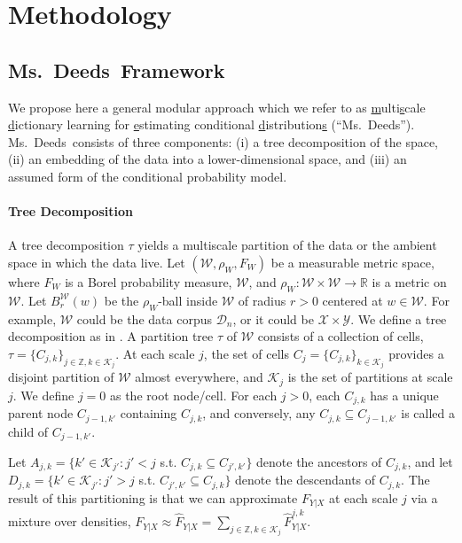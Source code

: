 \documentclass{article} %
\newcommand{\Real}{\mathbb{R}}
\providecommand{\mh}[1]{\hat{#1}}
\providecommand{\mc}[1]{\mathcal{#1}}
\newcommand{\from}{{\ensuremath{\colon}}}  %
\newcommand{\msd}{Ms.~Deeds}
\newcommand{\ZZ}{\mathbb{Z}}
\begin{document}
\section{Methodology} \label{sec:method}

\subsection{\msd~Framework} \label{sub:method}

We propose here a general modular approach which we refer to as \uline{m}ulti\uline{s}cale \uline{d}ictionary learning for \uline{e}stimating conditional \uline{d}istribution\uline{s} (``\msd''). \msd~consists of three components: (i) a tree decomposition of the space, (ii) an embedding of the data into a lower-dimensional space,  and (iii) an assumed form of the conditional probability model. 

\paragraph{Tree Decomposition}
A tree decomposition $\tau$ yields a multiscale partition of the data or the ambient space in which the data live.
Let $(\mc{W},\rho_W, F_W)$ be a measurable metric space, where $F_W$ is a Borel probability measure, $\mc{W}$, and $\rho_W \from \mc{W} \times \mc{W} \to \Real$ is a metric on $\mc{W}$.  Let $B_r^{\mc{W}}(w)$ be the $\rho_W$-ball inside $\mc{W}$ of radius $r > 0$ centered at $w \in \mc{W}$. For example, $\mc{W}$ could be the data corpus $\mc{D}_n$, or it could be $\mc{X} \times \mc{Y}$. We define a tree decomposition as in \cite{Allard2012,ChenMaggioni12}.  A partition tree $\tau$ of $\mc{W}$ consists of a collection of cells, $\tau=\{C_{j,k}\}_{j \in \ZZ, k \in \mc{K}_j}$.  At each scale $j$, the set of cells $C_j=\{C_{j,k}\}_{k \in \mc{K}_j}$ provides a disjoint partition of $\mc{W}$ almost everywhere, and $\mc{K}_j$ is the set of partitions at scale $j$.  We define $j=0$ as the root node/cell.  For each $j > 0$,  each $C_{j,k}$ has a unique parent node $C_{j-1,k'}$ containing $C_{j,k}$, and conversely, any $C_{j,k} \subseteq C_{j-1,k'}$ is called a child of $C_{j-1,k'}$.


Let $A_{j,k}=\{k' \in \mc{K}_{j'} : j' < j$ s.t. $C_{j,k} \subseteq C_{j',k'}\}$ denote the ancestors of $C_{j,k}$, and let $D_{j,k}=\{k' \in \mc{K}_{j'} : j' > j$ s.t. $C_{j',k'} \subseteq C_{j,k}\}$ denote the descendants of $C_{j,k}$.
The result of this partitioning is that we can approximate $F_{Y|X}$ at each scale $j$ via a mixture over densities, $F_{Y|X} \approx \mh{F}_{Y|X}= \sum_{j \in \ZZ, k \in \mc{K}_j} \mh{F}^{j,k}_{Y|X}$. 
\end{document}
